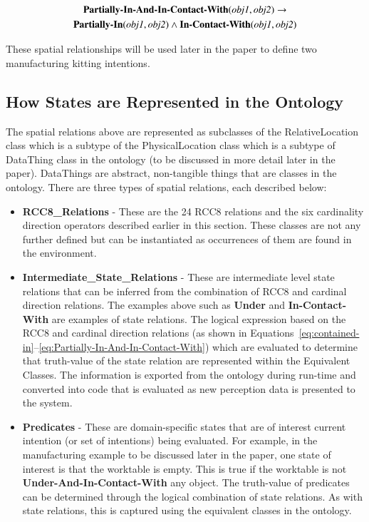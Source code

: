 \documentclass[final,1p,times]{elsarticle}
\newcommand{\sr}[1] {\textbf{#1}}
\newcommand{\class}[1] {\textsf{#1}}
\begin{document}
\begin{gather}
\label{eq:Partially-In-And-In-Contact-With}
\textbf{Partially-In-And-In-Contact-With}(\textit{obj1}, \textit{obj2}) \rightarrow\\
\textbf{Partially-In}(\textit{obj1}, \textit{obj2}) \wedge \textbf{In-Contact-With}(\textit{obj1}, \textit{obj2})\notag
\end{gather}

These spatial relationships will be used later in the paper to define two manufacturing kitting intentions.

\subsection{How States are Represented in the Ontology}
The spatial relations above are represented as subclasses of the \class{RelativeLocation} class which is a subtype of the \class{PhysicalLocation} class which is a subtype of \class{DataThing} class in the ontology (to be discussed in more detail later in the paper). \class{DataThings} are abstract, non-tangible things that are classes in the ontology. There are three types of spatial relations, each described below:
\begin{itemize}
\item \textbf{RCC8\_Relations} - These are the 24 RCC8 relations and the six cardinality direction operators described earlier in this section. These classes are not any further defined but can be instantiated as occurrences of them are found in the environment.
\item \textbf{Intermediate\_State\_Relations} - These are intermediate level state relations that can be inferred from the combination of RCC8 and cardinal direction relations. The examples above such as \sr{Under} and \sr{In-Contact-With} are examples of state relations. The logical expression based on the RCC8 and cardinal direction relations (as shown in Equations~\ref{eq:contained-in}--\ref{eq:Partially-In-And-In-Contact-With}) which are evaluated to determine that truth-value of the state relation are represented within the Equivalent Classes. The information is exported from the ontology during run-time and converted into code that is evaluated as new perception data is presented to the system.
\item \textbf{Predicates} - These are domain-specific states that are of interest current intention (or set of intentions) being evaluated. For example, in the manufacturing example to be discussed later in the paper, one state of interest is that the worktable is empty. This is true if the worktable is not \sr{Under-And-In-Contact-With} any object. The truth-value of predicates can be determined through the logical combination of state relations. As with state relations, this is captured using the equivalent classes in the ontology.
\end{itemize}
\end{document}
